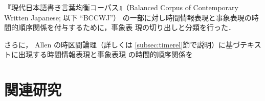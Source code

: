 \documentclass[japanese]{jnlp_1.4}
\newcommand{\modified}[1]{}
\begin{document}
\modified{本研究では，研究目的として哲学者・言語学者の(a)の立場を取り，}
『現代日本語書き言葉均衡コーパス』（Balanced Corpus of Contemporary Written
Japanese; 以下 ``BCCWJ''）\cite{BCCWJ} の一部に対し時間情報表現と事象表現の時間的順序関係を付与するために，事象表
現の切り出しと分類を行った．
\modified{時間情報表現アノテーションの形式的な基準である国際標準 ISO-TimeML の日
本語適応作業を MAMAサイクル\cite{Pustejovsky-2012}（Model-Annotate-Model-Annotate サイクル．詳しく
は \ref{subsec:anno}節で説明）を通して実施し，
時間的順序関係付与に適した事象表現分類を行った．}
さらに，\modified{複数人の時区間の時間的順序関係の認識の差異を評価することを目的として，}
Allen の時区間論理\cite{allen-1983}（詳しくは \ref{subsec:timerel}節で説明）に基づ\modified{いた}テキストに出現する時間情報表現と事象表現
の時間的順序関係\modified{のアノテーション}を\modified{複数人で実施した．
MAMAサイクルを最小にし被験者実験的な設定でアノテーションを行い，
得られたデータの傾向を分析し，複数人の作業者間の心的空間における時間構造の差異を
評価した．}

\modified{意味論レベルのアノテーションにおいて，多くの研究が形式意味論的な記述を目標とする．
生成された言語を直接何らかの記号的な意味表現に写像するための方法論を確立するため
にアノテーションの MAMA サイクルを実施するが，唯一無二の意味表現に写像することを
目的とするためにアノテーション一致率という指標を良くする方向に最適化するきらいが
ある．一方，認知意味論の考え方においては，生成された言語表現を受容する人間の認知
活動という要素を考慮し，人間の空間認知能力やカテゴリー化などの認知能力を評価する
目的で，被験者実験などの研究手法が用いられている．テキストを刺激として与え，意味表
現を記述させる被験者実験も広義のアノテーションと呼ぶことができる．}

\modified{本研究では人間の時間的順序関係の認知能力の差異の評価を目的として，教示である
MAMA サイクルを必要十分レベルに極小化した，被験者実験としてのアノテーションを行
う．
結果，時区間の境界の一致が困難である一方，時区間の前後関係については69.5\% の一
致率でアノテーションできることがわかった．}

\modified{
以下本論文の構成について述べる．\ref{sec:related}節では関連研究について述べる．
\ref{sec:standard}節では策定した基準について述べる．
\ref{sec:analysis}節で BCCWJ にアノテーションした順序関係ラベルの分析を行い，結
果を報告する．
\ref{sec:conclusion}節で本論文のまとめを行う．}


\section{関連研究}
\label{sec:related}
\end{document}
